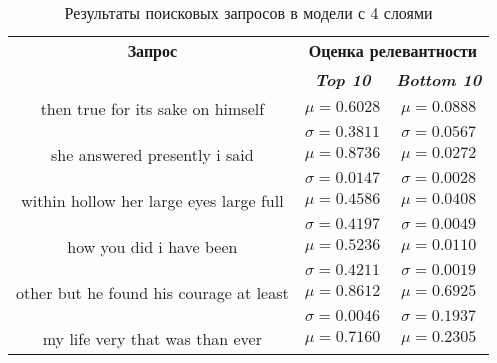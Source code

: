 \begin{table}[tbp]
    \caption{Результаты поисковых запросов в модели с 4 слоями}
    \begin{center}
        \begin{tabular}{ccc}
            \toprule
            \textbf{Запрос} & \multicolumn{2}{c}{\textbf{Оценка релевантности}}                               \\
                            & \textbf{\textit{Top 10}}                          & \textbf{\textit{Bottom 10}} \\
            \midrule
            then true for its sake on himself         & \(\mu=0.6028\)                                    & \(\mu=0.0888\)              \\
                                                      & \(\sigma=0.3811\)                                 & \(\sigma=0.0567\)           \\
            \midrule
            she answered   presently i said           & \(\mu=0.8736\)                                    & \(\mu=0.0272\)              \\
                                                      & \(\sigma=0.0147\)                                 & \(\sigma=0.0028\)           \\
            \midrule
            within hollow her large eyes large full   & \(\mu=0.4586\)                                    & \(\mu=0.0408\)              \\
                                                      & \(\sigma=0.4197\)                                 & \(\sigma=0.0049\)           \\
            \midrule
            how you did  i have been                  & \(\mu=0.5236\)                                    & \(\mu=0.0110\)              \\
                                                      & \(\sigma=0.4211\)                                 & \(\sigma=0.0019\)           \\
            \midrule
            other but he found his courage at least   & \(\mu=0.8612\)                                    & \(\mu=0.6925\)              \\
                                                      & \(\sigma=0.0046\)                                 & \(\sigma=0.1937\)           \\
            \midrule
            my life very that was than ever           & \(\mu=0.7160\)                                    & \(\mu=0.2305\)              \\

\end{tabular}
\end{center}
\end{table}
